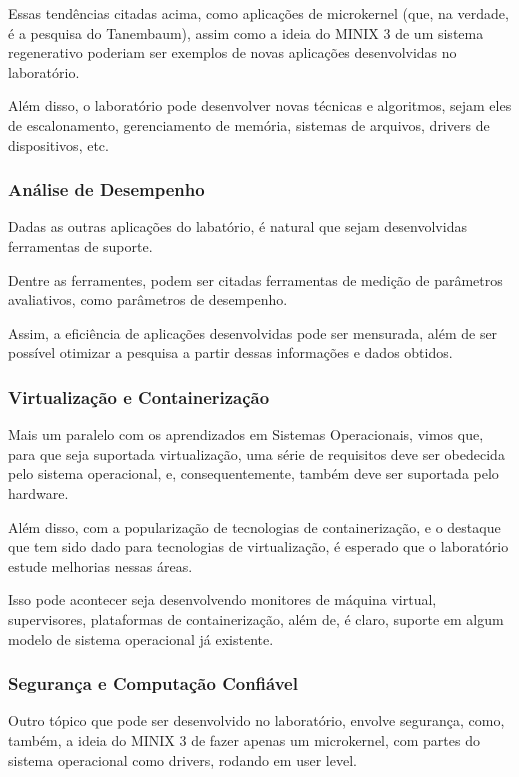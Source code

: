 Essas tendências citadas acima, como aplicações de microkernel (que, na
verdade, é a pesquisa do Tanembaum), assim como a ideia do MINIX 3
de um sistema regenerativo poderiam ser exemplos de novas aplicações
desenvolvidas no laboratório.

Além disso, o laboratório pode desenvolver novas técnicas e algoritmos,
sejam eles de escalonamento, gerenciamento de memória, sistemas de
arquivos, drivers de dispositivos, etc.

\subsubsection{Análise de Desempenho}

Dadas as outras aplicações do labatório, é natural que sejam
desenvolvidas ferramentas de suporte.

Dentre as ferramentes, podem ser citadas ferramentas de medição
de parâmetros avaliativos, como parâmetros de desempenho.

Assim, a eficiência de aplicações desenvolvidas pode ser mensurada,
além de ser possível otimizar a pesquisa a partir dessas informações
e dados obtidos.

\subsubsection{Virtualização e Containerização}

Mais um paralelo com os aprendizados em Sistemas Operacionais,
vimos que, para que seja suportada virtualização, uma série de requisitos
deve ser obedecida pelo sistema operacional, e, consequentemente, também
deve ser suportada pelo hardware.

Além disso, com a popularização de tecnologias de containerização,
e o destaque que tem sido dado para tecnologias de virtualização,
é esperado que o laboratório estude melhorias nessas áreas.

Isso pode acontecer seja desenvolvendo monitores de máquina virtual,
supervisores, plataformas de containerização, além de, é claro,
suporte em algum modelo de sistema operacional já existente.

\subsubsection{Segurança e Computação Confiável}

Outro tópico que pode ser desenvolvido no laboratório, envolve segurança,
como, também, a ideia do MINIX 3 de fazer apenas um microkernel, com
partes do sistema operacional como drivers, rodando em user level.

